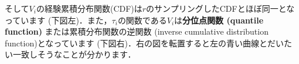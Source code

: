 そして$V_i$の経験累積分布関数(CDF)は$r$のサンプリングしたCDFとほぼ同一となっています (下図左)．また，$\tau_i$の関数である$V_i$は\textbf{分位点関数 (quantile function)} または累積分布関数の逆関数 (inverse cumulative distribution function)となっています
(下図右)．右の図を転置すると左の青い曲線とだいたい一致しそうなことが分かります．